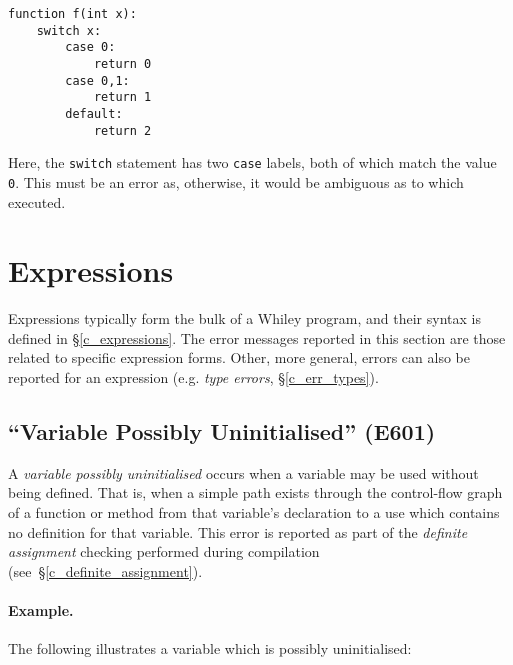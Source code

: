 \begin{lstlisting}
function f(int x):
    switch x:
        case 0:
            return 0
        case 0,1:
            return 1
        default:
            return 2
\end{lstlisting}

Here, the \lstinline{switch} statement has two \lstinline{case} labels, both of which match the value \lstinline{0}.  This must be an error as, otherwise, it would be ambiguous as to which executed.


\section{Expressions}




Expressions typically form the bulk of a Whiley program, and their syntax is defined in \S\ref{c_expressions}.  The error messages reported in this section are those related to specific expression forms.  Other, more general, errors can also be reported for an expression (e.g. {\em type errors}, \S\ref{c_err_types}).

\subsection{``Variable Possibly Uninitialised'' (E601)}
\label{c_err_var_uninitialised}
A {\em variable possibly uninitialised} occurs when a variable may be used without being defined.  That is, when a simple path exists through the control-flow graph of a function or method from that variable's declaration to a use which contains no definition for that variable.  This error is reported as part of the {\em definite assignment} checking performed during compilation (see~\S\ref{c_definite_assignment}).

\paragraph{Example.}  The following illustrates a variable which is possibly uninitialised:

